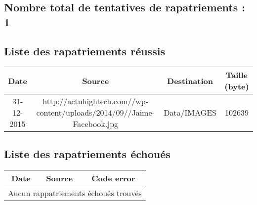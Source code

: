 \documentclass[a4paper,11pt,tikz]{article}
\begin{document}
  \subsection{Nombre total de tentatives de rapatriements : 1}
    
  \subsection{Liste des rapatriements réussis}
    \scalebox{0.7}
    {
      \begin{tabular}{|c|c|c|c|}
        \hline
        Date & Source & Destination & Taille (byte) \\
        \hline
           31-12-2015 & http://actuhightech.com//wp-content/uploads/2014/09//Jaime-Facebook.jpg & Data/IMAGES & 102639 \\ 
        \hline
      \end{tabular}
    }

  \subsection{Liste des rapatriements échoués}
    \scalebox{0.7}
    {
      \begin{tabular}{|c|c|c|}
        \hline
        Date & Source & Code error  \\
        \hline
        \multicolumn{3}{|c|}{Aucun rappatriements échoués trouvés} \\
        \hline
      \end{tabular}
    }


\end{document}
